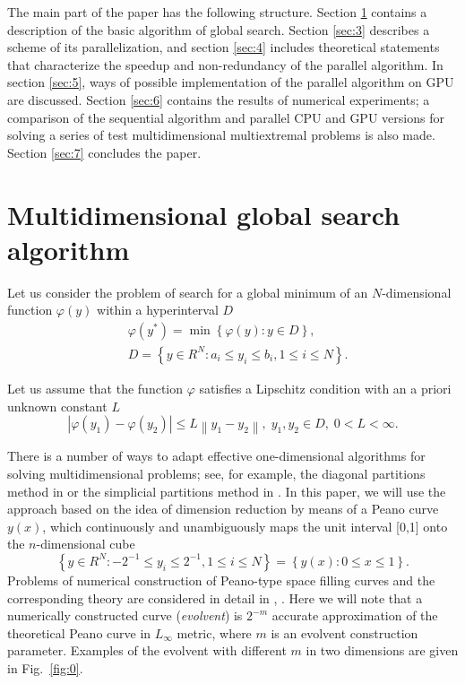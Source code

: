 \documentclass[smallcondensed]{svjour3}     %
\begin{document}
The main part of the paper has the following structure. Section \ref{sec:2} contains a description of the basic algorithm of global search. Section \ref{sec:3} describes a scheme of its parallelization, and section \ref{sec:4} includes theoretical statements that characterize the speedup and non-redundancy of the parallel algorithm. In section \ref{sec:5}, ways of possible implementation of the parallel algorithm on GPU are discussed. Section \ref{sec:6} contains the results of numerical experiments; a comparison of the sequential algorithm and parallel CPU and GPU versions for solving a series of test multidimensional multiextremal problems is also made. Section \ref{sec:7} concludes the paper.

\section{Multidimensional global search algorithm} \label{sec:2}

Let us consider the problem of search for a global minimum of an $N$-dimensional function $\varphi(y)$ within a hyperinterval $D$
\begin{eqnarray}\label{eq:1}
& \varphi(y^\ast)=\min{\left\{\varphi(y):y\in D\right\}},\\
& D=\left\{y\in R^N: a_i\leq y_i \leq b_i, 1\leq i \leq N\right\}. \nonumber
\end{eqnarray}

Let us assume that the function $\varphi$ satisfies a Lipschitz condition with an a priori unknown constant $L$
\[
\left|\varphi(y_1)-\varphi(y_2)\right|\leq L\left\|y_1-y_2\right\|,\; y_1,y_2 \in D,\; 0<L<\infty.
\]

There is a number of ways to adapt effective one-dimensional algorithms for solving multidimensional problems; see, for example, the diagonal partitions method in \cite{RefSergeyev2006} or the simplicial partitions method in \cite{RefZilinskas}. In this paper, we will use the approach based on the idea of dimension reduction by means of a Peano curve $y(x)$, which continuously and unambiguously maps the unit interval [0,1] onto the $n$-dimensional cube
\[
\left\{y\in R^N: -2^{-1}\leq y_i \leq 2^{-1}, 1 \leq i \leq N\right\}=\left\{y(x):0\leq x \leq 1 \right\}.
\]
Problems of numerical construction of Peano-type space filling curves and the corresponding theory are considered in detail in \cite{RefStrongin2000}, \cite{RefSergeyev2013}.  
Here we will note that a numerically constructed curve (\textit{evolvent}) is $2^{-m}$ accurate approximation of the theoretical Peano curve in $L_\infty$ metric, where $m$ is an evolvent construction parameter. Examples of the evolvent with different $m$ in two dimensions are given in Fig.~\ref{fig:0}.
\end{document}
